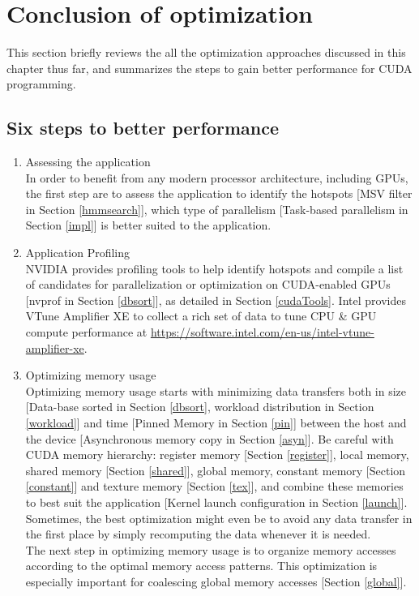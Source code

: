 
\section{Conclusion of optimization}

This section briefly reviews the all the optimization approaches discussed in this chapter thus far, and summarizes the steps to gain better performance for CUDA programming.

\subsection*{Six steps to better performance}
\begin{enumerate}
 \item Assessing the application\\
 In order to benefit from any modern processor architecture, including GPUs, the first step are to assess the application to identify the hotspots [MSV filter in Section \ref{hmmsearch}], which type of parallelism [Task-based parallelism in Section \ref{impl}] is better suited to the application.
 \item Application Profiling\\
 NVIDIA provides profiling tools to help identify hotspots and compile a list of candidates for parallelization or optimization on CUDA-enabled GPUs [nvprof in Section \ref{dbsort}], as detailed in Section \ref{cudaTools}. 
 Intel provides VTune Amplifier XE to collect a rich set of data to tune CPU \& GPU compute performance at \url{https://software.intel.com/en-us/intel-vtune-amplifier-xe}.
 
 \item Optimizing memory usage\\
 Optimizing memory usage starts with minimizing data transfers both in size [Data-base sorted in Section \ref{dbsort}, workload distribution in Section \ref{workload}] and time [Pinned Memory in Section \ref{pin}] between the host and the device [Asynchronous memory copy in Section \ref{asyn}]. Be careful with CUDA memory hierarchy: register memory [Section \ref{register}], local memory, shared memory [Section \ref{shared}], global memory, constant memory [Section \ref{constant}] and texture memory [Section \ref{tex}], and combine these memories to best suit the application [Kernel launch configuration in Section \ref{launch}]. Sometimes, the best optimization might even be to avoid any data transfer in the first place by simply recomputing the data whenever it is needed.\\
 The next step in optimizing memory usage is to organize memory accesses according to the optimal memory access patterns. This optimization is especially important for coalescing global memory accesses [Section \ref{global}].
 

\end{enumerate}
